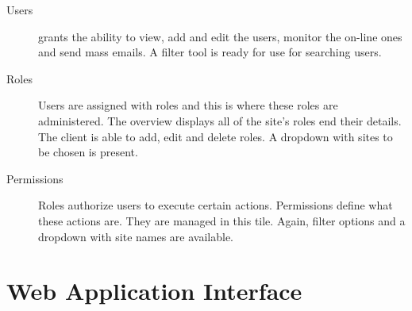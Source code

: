 \begin{description}
\begin {description}
	\item [Users] grants the ability to view, add and edit the users, monitor the on-line ones and send mass emails. A filter tool is ready for use for searching users.
	\item [Roles] Users are assigned with roles and this is where these roles are administered. The overview displays all of the site's roles end their details. The client is able to add, edit and delete roles. A dropdown with sites to be chosen is present. 
	\item [Permissions] Roles authorize users to execute certain actions. Permissions define what these actions are. They are managed in this tile. Again, filter options and a dropdown with site names are available. 
	\end{description}
\end{description}



\section{Web Application Interface} \label{analysisWebAPI}
